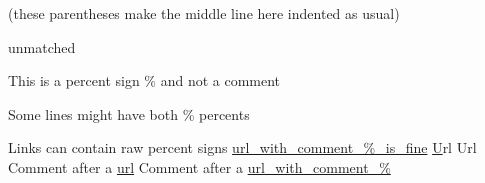 \documentclass{article}
\begin{document}
(these parentheses
make the middle line here
indented as usual)


unmatched %

This is a percent sign \% and not a comment

Some lines might have both \% percents %

Links can contain raw percent signs
\url{url_with_comment_%_is_fine}
\href{url_with_comment_%_is_fine}
Url %
Url %
Comment after a \url{url} %
Comment after a \url{url_with_comment_%} %
\end{document}
